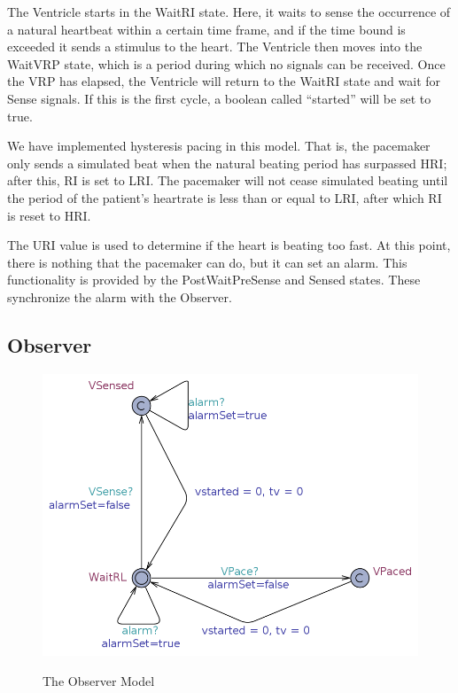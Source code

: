 \documentclass[10pt]{article}
\begin{document}
The Ventricle starts in the WaitRI state. Here, it waits to sense the occurrence of a natural heartbeat within a certain time frame, and if the time bound is exceeded it sends a stimulus to the heart. The Ventricle then moves into the WaitVRP state, which is a period during which no signals can be received. Once the VRP has elapsed, the Ventricle will return to the WaitRI state and wait for Sense signals. If this is the first cycle, a boolean called “started” will be set to true.

We have implemented hysteresis pacing in this model. That is, the pacemaker only sends a simulated beat when the natural beating period has surpassed HRI; after this, RI is set to LRI. The pacemaker will not cease simulated beating until the period of the patient’s heartrate is less than or equal to LRI, after which RI is reset to HRI.

The URI value is used to determine if the heart is beating too fast. At this point, there is nothing that the pacemaker can do, but it can set an alarm. This functionality is provided by the PostWaitPreSense and Sensed states. These synchronize the alarm with the Observer.

	\subsection{Observer}
		\begin{figure}[h]
			\includegraphics[scale=.4]{observer_model.jpg}
			\label{observer_model}
			\centering
			\caption{The Observer Model}
		\end{figure}
\end{document}
